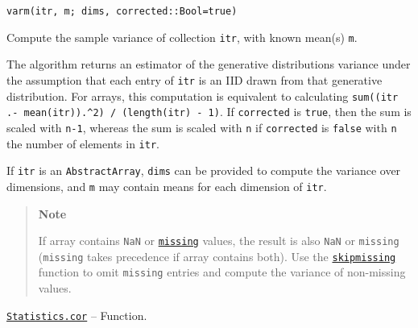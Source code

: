 \begin{adjustwidth}{2em}{0pt}


\begin{verbatim}
varm(itr, m; dims, corrected::Bool=true)
\end{verbatim}

Compute the sample variance of collection \texttt{itr}, with known mean(s) \texttt{m}.

The algorithm returns an estimator of the generative distribution{\textquotesingle}s variance under the assumption that each entry of \texttt{itr} is an IID drawn from that generative distribution. For arrays, this computation is equivalent to calculating \texttt{sum((itr .- mean(itr)).{\textasciicircum}2) / (length(itr) - 1)}. If \texttt{corrected} is \texttt{true}, then the sum is scaled with \texttt{n-1}, whereas the sum is scaled with \texttt{n} if \texttt{corrected} is \texttt{false} with \texttt{n} the number of elements in \texttt{itr}.

If \texttt{itr} is an \texttt{AbstractArray}, \texttt{dims} can be provided to compute the variance over dimensions, and \texttt{m} may contain means for each dimension of \texttt{itr}.

\begin{quote}
\textbf{Note}

If array contains \texttt{NaN} or \hyperlink{14596725676261444434}{\texttt{missing}} values, the result is also \texttt{NaN} or \texttt{missing} (\texttt{missing} takes precedence if array contains both). Use the \hyperlink{2012470681884771400}{\texttt{skipmissing}} function to omit \texttt{missing} entries and compute the variance of non-missing values.

\end{quote}


\end{adjustwidth}
\hypertarget{16231972474237968518}{} 
\hyperlink{16231972474237968518}{\texttt{Statistics.cor}}  -- {Function.}


